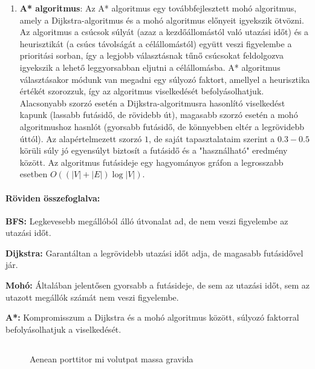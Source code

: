 \begin{enumerate}
	\item \textbf{A* algoritmus}: Az A* algoritmus egy továbbfejlesztett mohó algoritmus, amely a Dijkstra-algoritmus és a mohó algoritmus előnyeit igyekszik ötvözni. Az algoritmus a csúcsok súlyát (azaz a kezdőállomástól való utazási időt) és a heurisztikát (a csúcs távolságát a célállomástól) együtt veszi figyelembe a prioritási sorban, így a legjobb választásnak tűnő csúcsokat feldolgozva igyekszik a lehető leggyorsabban eljutni a célállomásba. A* algoritmus választásakor módunk van megadni egy súlyozó faktort, amellyel a heurisztika értékét szorozzuk, így az algoritmus viselkedését befolyásolhatjuk. Alacsonyabb szorzó esetén a Dijkstra-algoritmusra hasonlító viselkedést kapunk (lassabb futásidő, de rövidebb út), magasabb szorzó esetén a mohó algoritmushoz hasnlót (gyorsabb futásidő, de könnyebben eltér a legrövidebb úttól). Az alapértelmezett szorzó $1$, de saját tapasztalataim szerint a $0.3-0.5$ körüli súly jó egyensúlyt biztosít a futásidő és a "használható" eredmény között. Az algoritmus futásideje egy hagyományos gráfon a legrosszabb esetben $O((|V| + |E|) \log |V|)$.
\end{enumerate}

\paragraph{Röviden összefoglalva:}

\begin{compactitem}
	\item \textbf{BFS:} Legkevesebb megállóból álló útvonalat ad, de nem veszi figyelembe az utazási időt.
	\item \textbf{Dijkstra:} Garantáltan a legrövidebb utazási időt adja, de magasabb futásidővel jár.
	\item \textbf{Mohó:} Általában jelentősen gyorsabb a futásideje, de sem az utazási időt, sem az utazott megállók számát nem veszi figyelembe.
	\item \textbf{A*:} Kompromisszum a Dijkstra és a mohó algoritmus között, súlyozó faktorral befolyásolhatjuk a viselkedését.
\end{compactitem}

\subsection{}

\begin{figure}[H]
	\centering
	\hspace{5pt}
	\caption{Aenean porttitor mi volutpat massa gravida}
	\label{fig:example-2}
\end{figure}


